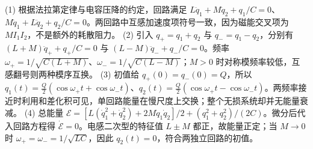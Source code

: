 (1) 根据法拉第定律与电容压降的约定，回路满足 \(L\ddot q_1+M\ddot q_2+q_1/C=0\)、\(M\ddot q_1+L\ddot q_2+q_2/C=0\)。两回路中互感加速度项符号一致，因为磁能交叉项为 \(M I_1I_2\)，不是额外的耗散阻力。
(2) 引入 \(q_+=q_1+q_2\) 与 \(q_-=q_1-q_2\)，分别有 \((L+M)\ddot q_++q_+/C=0\) 与 \((L-M)\ddot q_-+q_-/C=0\)。频率 \(\omega_+=1/\sqrt{C(L+M)}\)、\(\omega_-=1/\sqrt{C(L-M)}\)；\(M>0\) 时对称模频率较低，互感翻号则两种模序互换。
(3) 初值给 \(q_+(0)=q_-(0)=Q\)，所以 \(q_1(t)=\frac Q2(\cos\omega_+t+\cos\omega_-t)\)、\(q_2(t)=\frac Q2(\cos\omega_+t-\cos\omega_-t)\)。两频率接近时利用和差化积可见，单回路能量在慢尺度上交换；整个无损系统却并无能量衰减。
(4) 总能量 \(\mathcal E=[L(\dot q_1^2+\dot q_2^2)+2M\dot q_1\dot q_2]/2+(q_1^2+q_2^2)/(2C)\)。微分后代入回路方程得 \(\dot{\mathcal E}=0\)。电感二次型的特征值 \(L\pm M\) 都正，故能量正定；当 \(M\to0\) 时 \(\omega_+=\omega_-=1/\sqrt{LC}\)，因此 \(q_2(t)=0\)，符合两独立回路的初值。
